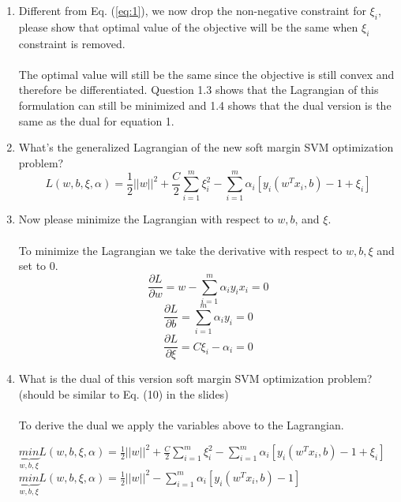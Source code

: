 \documentclass[11pt]{article}
\begin{document}
\begin{enumerate}
	\item Different from Eq. (\ref{eq:1}), we now drop the non-negative constraint for $\xi_i$, please show that optimal value of the objective will be the same when $\xi_i$ constraint is removed.\\\\
	The optimal value will still be the same since the objective is still convex and therefore be differentiated. Question 1.3 shows that the Lagrangian of this formulation can still be minimized and 1.4 shows that the dual version is the same as the dual for equation 1. 
	\item What's the generalized Lagrangian of the new soft margin SVM optimization problem?
	\begin{equation}
	L(w, b, \xi, \alpha) = \frac{1}{2}||w||^2 + \frac{C}{2}\sum^m_{i=1}\xi_i^2 - \sum^m_{i=1}\alpha_i[y_i(w^T x_i, b) - 1 + \xi_i]
	\end{equation}
	\item Now please minimize the Lagrangian with respect to $w, b$, and $\xi$.\\\\
	To minimize the Lagrangian we take the derivative with respect to $w, b, \xi$ and set to 0.
	\begin{equation}
	\frac{\partial L}{\partial w} = w - \sum^m_{i=1}\alpha_i y_i x_i = 0
	\end{equation}
	\begin{equation}
	\frac{\partial L}{\partial b} = \sum^m_{i=1}\alpha_i y_i = 0
	\end{equation}
	\begin{equation}
	\frac{\partial L}{\partial \xi} = C \xi_i - \alpha_i = 0
	\end{equation}
	\item What is the dual of this version soft margin SVM optimization problem? (should be similar to Eq. (10) in the slides)\\\\
	To derive the dual we apply the variables above to the Lagrangian. \\
	\begin{center}
	$\underbrace{min}_{w, b, \xi} L(w, b, \xi, \alpha) = \frac{1}{2}||w||^2 + \frac{C}{2}\displaystyle\sum^m_{i=1}\xi_i^2 - \displaystyle\sum^m_{i=1}\alpha_i[y_i(w^T x_i, b) - 1 + \xi_i] $\\
	$\underbrace{min}_{w, b, \xi} L(w, b, \xi, \alpha) = \frac{1}{2}||w||^2 - \displaystyle\sum^m_{i=1}\alpha_i[y_i(w^T x_i, b) - 1]$\\

\end{center}
\end{enumerate}
\end{document}
